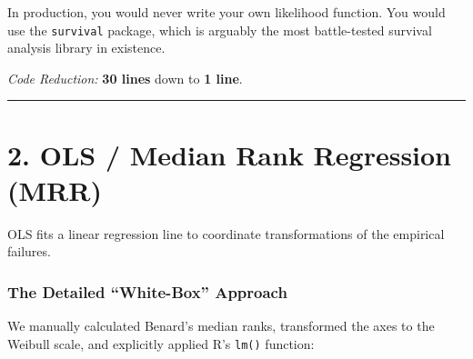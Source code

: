 \documentclass[
]{article}
\newenvironment{Shaded}{\begin{snugshade}}{\end{snugshade}}
\newcommand{\AttributeTok}[1]{\textcolor[rgb]{0.13,0.29,0.53}{#1}}
\newcommand{\CommentTok}[1]{\textcolor[rgb]{0.56,0.35,0.01}{\textit{#1}}}
\newcommand{\DecValTok}[1]{\textcolor[rgb]{0.00,0.00,0.81}{#1}}
\newcommand{\FunctionTok}[1]{\textcolor[rgb]{0.13,0.29,0.53}{\textbf{#1}}}
\newcommand{\NormalTok}[1]{#1}
\newcommand{\OtherTok}[1]{\textcolor[rgb]{0.56,0.35,0.01}{#1}}
\newcommand{\SpecialCharTok}[1]{\textcolor[rgb]{0.81,0.36,0.00}{\textbf{#1}}}
\newcommand{\StringTok}[1]{\textcolor[rgb]{0.31,0.60,0.02}{#1}}
\begin{document}
In production, you would never write your own likelihood function. You
would use the \texttt{survival} package, which is arguably the most
battle-tested survival analysis library in existence.

\begin{Shaded}
\end{Shaded}

\emph{Code Reduction:} \textbf{30 lines} down to \textbf{1 line}.

\begin{center}\rule{0.5\linewidth}{0.5pt}\end{center}

\section{2. OLS / Median Rank Regression
(MRR)}\label{ols-median-rank-regression-mrr}

OLS fits a linear regression line to coordinate transformations of the
empirical failures.

\subsubsection{The Detailed ``White-Box''
Approach}\label{the-detailed-white-box-approach-1}

We manually calculated Benard's median ranks, transformed the axes to
the Weibull scale, and explicitly applied R's \texttt{lm()} function:
\end{document}
